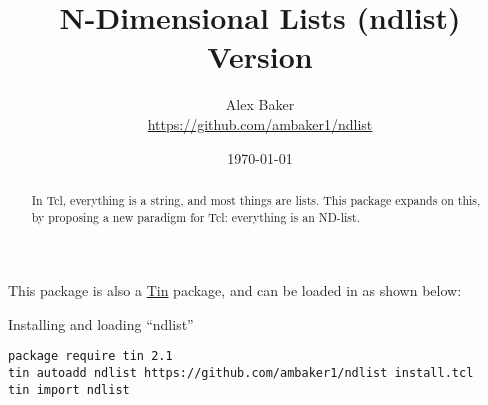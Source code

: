 \documentclass{article}
\title{\Huge{N-Dimensional Lists (ndlist)}\\\large Version \version}
\author{Alex Baker\\\small\url{https://github.com/ambaker1/ndlist}}
\date{\small\today}
\begin{document}
\maketitle
\begin{abstract}
In Tcl, everything is a string, and most things are lists. This package expands on this, by proposing a new paradigm for Tcl: everything is an ND-list. 
\end{abstract}
\vspace{20 pt}

This package is also a \textcolor{blue}{\href{https://github.com/ambaker1/Tin}{Tin}} package, and can be loaded in as shown below:
\begin{example}{Installing and loading ``ndlist''}
\begin{lstlisting}
package require tin 2.1
tin autoadd ndlist https://github.com/ambaker1/ndlist install.tcl
tin import ndlist
\end{lstlisting}
\end{example}

\clearpage





{\footnotesize \printindex}
\end{document}
